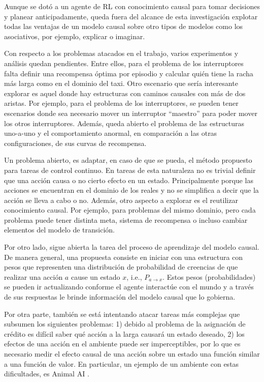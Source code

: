 Aunque se dotó a un agente de RL con conocimiento causal para tomar decisiones y planear anticipadamente, queda fuera del alcance de esta investigación explotar todas las ventajas de un modelo causal sobre otro tipos de modelos como los asociativos, por ejemplo, explicar o imaginar.

Con respecto a los problemas atacados en el trabajo,
varios experimentos y análisis quedan pendientes. Entre ellos, 
para el problema de los interruptores falta 
definir una recompensa óptima por episodio y 
calcular quién tiene la racha más larga como en el dominio del taxi.  Otro escenario que sería interesante
explorar es aquel donde hay estructuras con caminos causales con más de dos aristas. Por ejemplo, para el problema de los interruptores, se pueden
tener escenarios donde sea necesario mover un interruptor ``maestro'' para
poder mover los otros interruptores. Además, queda abierto el problema
de las estructuras uno-a-uno y el comportamiento anormal, en comparación
a las otras configuraciones, de sus curvas de recompensa.

Un problema abierto, es adaptar, en caso de que se pueda, el método propuesto para 
tareas de control continuo. En tareas de esta naturaleza no es trivial definir que una acción 
causa o no cierto efecto en un estado. Principalmente porque las acciones se encuentran
en el dominio de los reales y no se simplifica a decir que la acción se lleva a cabo o no.
Además, otro aspecto a explorar es el reutilizar conocimiento causal. Por ejemplo, 
para problemas del mismo dominio, pero cada problema puede tener distinta meta, sistema
de recompensa o incluso cambiar elementos del modelo de transición.

Por otro lado, sigue abierta la tarea del proceso de aprendizaje del modelo
causal. De manera general, una propuesta consiste en iniciar con una estructura con pesos que representen 
una distribución de probabilidad de creencias de que realizar una acción $a$ cause un estado $x$, i.e., $P_{a\rightarrow x}$. Estos pesos (probabilidades) se pueden
ir actualizando conforme el agente interactúe con el mundo y
a través de sus respuestas le brinde información del modelo causal que lo gobierna.

Por otra parte, también se está intentando atacar tareas más 
complejas que subsumen los siguientes problemas: 1) debido al problema de la asignación de crédito es difícil saber qué acción a la larga causará un estado deseado, 2) los efectos de una acción en el ambiente puede ser imperceptibles, por lo que es necesario medir el efecto causal de una acción sobre un estado una función similar a una función de valor. En particular, un ejemplo de un ambiente con estas dificultades, es Animal AI \cite{beyret2019animalai}.




